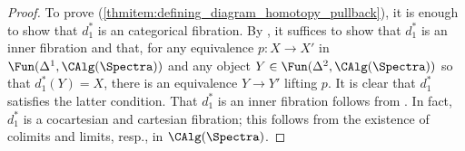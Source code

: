 \begin{proof}
    To prove (\ref{thmitem:defining_diagram_homotopy_pullback}), it is enough to show that $d_1^*$ is an categorical fibration. 
    By \cite[Corollary 2.4.6.5]{HTT}, it suffices to show that $ d_1^* $ is an inner fibration and that, for any equivalence $ p \colon X \to X' $ in $ \Fun(\Delta^1, \CAlg(\Spectra)) $ and any object $ Y \in \Fun(\Delta^2, \CAlg(\Spectra)) $ so that $ d_1^*(Y) = X $, there is an equivalence $ Y \to Y' $ lifting $ p $. 
    It is clear that $ d_1^* $ satisfies the latter condition. 
    That $ d_1^*$ is an inner fibration follows from \cite[Corollary 2.3.2.5]{HTT}. 
    In fact, $ d_1^* $ is a cocartesian and cartesian fibration; this follows from the existence of colimits and limits, resp., in $ \CAlg(\Spectra) $.


\end{proof}

